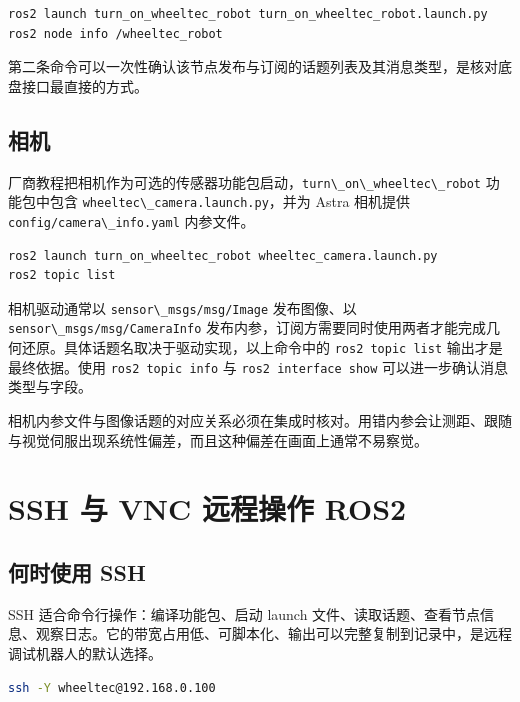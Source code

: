 \begin{lstlisting}[language=bash]
ros2 launch turn_on_wheeltec_robot turn_on_wheeltec_robot.launch.py
ros2 node info /wheeltec_robot
\end{lstlisting}

第二条命令可以一次性确认该节点发布与订阅的话题列表及其消息类型，是核对底盘接口最直接的方式。

\subsection{相机}\label{ux76f8ux673a}

厂商教程把相机作为可选的传感器功能包启动，\passthrough{\lstinline!turn\_on\_wheeltec\_robot!}
功能包中包含 \passthrough{\lstinline!wheeltec\_camera.launch.py!}，并为
Astra 相机提供 \passthrough{\lstinline!config/camera\_info.yaml!}
内参文件。

\begin{lstlisting}[language=bash]
ros2 launch turn_on_wheeltec_robot wheeltec_camera.launch.py
ros2 topic list
\end{lstlisting}

相机驱动通常以 \passthrough{\lstinline!sensor\_msgs/msg/Image!}
发布图像、以 \passthrough{\lstinline!sensor\_msgs/msg/CameraInfo!}
发布内参，订阅方需要同时使用两者才能完成几何还原。具体话题名取决于驱动实现，以上命令中的
\passthrough{\lstinline!ros2 topic list!} 输出才是最终依据。使用
\passthrough{\lstinline!ros2 topic info!} 与
\passthrough{\lstinline!ros2 interface show!}
可以进一步确认消息类型与字段。

相机内参文件与图像话题的对应关系必须在集成时核对。用错内参会让测距、跟随与视觉伺服出现系统性偏差，而且这种偏差在画面上通常不易察觉。

\section{SSH 与 VNC 远程操作
ROS2}\label{ssh-ux4e0e-vnc-ux8fdcux7a0bux64cdux4f5c-ros2}

\subsection{何时使用 SSH}\label{ux4f55ux65f6ux4f7fux7528-ssh}

SSH 适合命令行操作：编译功能包、启动 launch
文件、读取话题、查看节点信息、观察日志。它的带宽占用低、可脚本化、输出可以完整复制到记录中，是远程调试机器人的默认选择。

\begin{lstlisting}[language=bash]
ssh -Y wheeltec@192.168.0.100
\end{lstlisting}

